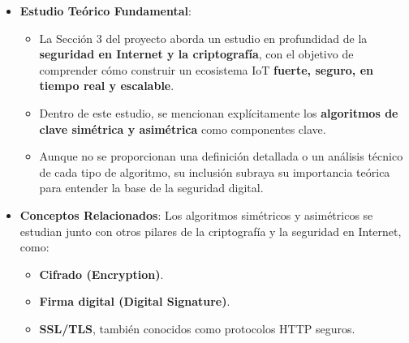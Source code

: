 \documentclass{report}
\begin{document}
\begin{itemize}
    \item \textbf{Estudio Teórico Fundamental}:
    \begin{itemize}
        \item La Sección 3 del proyecto aborda un estudio en profundidad de la \textbf{seguridad en Internet y la criptografía}, con el objetivo de 
        comprender cómo construir un ecosistema IoT \textbf{fuerte, seguro, en tiempo real y escalable}.
        \item Dentro de este estudio, se mencionan explícitamente los \textbf{algoritmos de clave simétrica y asimétrica} como componentes clave.
        \item Aunque no se  proporcionan una definición detallada o un análisis técnico de cada tipo de algoritmo, su inclusión subraya su 
        importancia teórica para entender la base de la seguridad digital.
    \end{itemize}

    \item \textbf{Conceptos Relacionados}: Los algoritmos simétricos y asimétricos se estudian junto con otros pilares de la criptografía y la 
    seguridad en Internet, como:
    \begin{itemize}
        \item \textbf{Cifrado (Encryption)}.
        \item \textbf{Firma digital (Digital Signature)}.
        \item \textbf{SSL/TLS}, también conocidos como protocolos HTTP seguros.
    \end{itemize}


\end{itemize}
\end{document}
